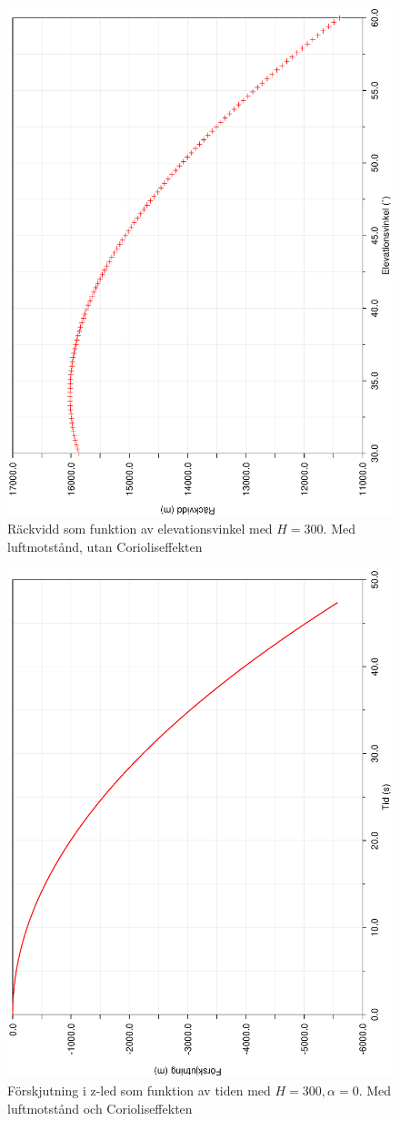 \documentclass[a4paper]{article}
\begin{document}
\begin{figure}[h!]
	\centering
	\includegraphics[width=0.5\linewidth, angle=-90]{Data/ProjektilH300Drag.eps}
	\caption{Räckvidd som funktion av elevationsvinkel med $H = 300$. Med luftmotstånd, utan Corioliseffekten}
	\label{fig:projektilH300Drag}
\end{figure}

\begin{figure}[h!]
	\centering
	\includegraphics[width=0.5\linewidth, angle=-90]{Data/ZdisplacementAlpha0.eps}
	\caption{Förskjutning i z-led som funktion av tiden med $H = 300, \alpha = 0$. Med luftmotstånd och Corioliseffekten}
	\label{fig:ZAlpha0}
\end{figure}
\end{document}
